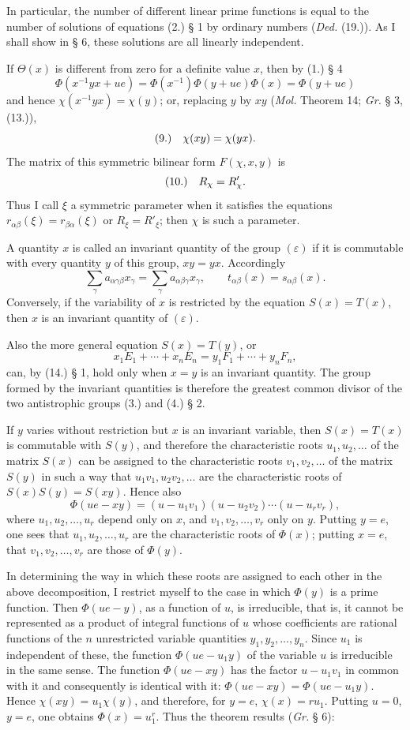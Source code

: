 \documentclass[11pt]{article}
\newcommand{\eps}{\varepsilon}
\newcommand{\fnum}[1]{\textup{(\ensuremath{#1}.)}\quad}
\begin{document}
In particular, the number of different linear prime functions is equal to the number of solutions of equations (2.) § 1 by ordinary numbers (\emph{Ded.} (19.)). As I shall show in § 6, these solutions are all linearly independent.

If $\Theta(x)$ is different from zero for a definite value $x$, then by (1.) § 4
\[
 \Phi(x^{-1}yx+ue)=\Phi(x^{-1})\Phi(y+ue)\Phi(x)=\Phi(y+ue)
\]
and hence $\chi(x^{-1}yx)=\chi(y)$; or, replacing $y$ by $xy$ (\emph{Mol.} Theorem 14; \emph{Gr.} § 3, (13.)),
\[
\fnum{9} \chi(xy)=\chi(yx).
\]
The matrix of this symmetric bilinear form $F(\chi,x,y)$ is
\[
\fnum{10} R_\chi=R'_\chi.
\]
Thus I call $\xi$ a symmetric parameter when it satisfies the equations $r_{\alpha\beta}(\xi)=r_{\beta\alpha}(\xi)$ or $R_\xi=R'_\xi$; then $\chi$ is such a parameter.

A quantity $x$ is called an invariant quantity of the group $(\eps)$ if it is commutable with every quantity $y$ of this group, $xy=yx$. Accordingly
\[
 \sum_\gamma a_{\alpha\gamma\beta}x_\gamma=\sum_\gamma a_{\alpha\beta\gamma}x_\gamma,\qquad
 t_{\alpha\beta}(x)=s_{\alpha\beta}(x).
\]
Conversely, if the variability of $x$ is restricted by the equation $S(x)=T(x)$, then $x$ is an invariant quantity of $(\eps)$.

Also the more general equation $S(x)=T(y)$, or
\[
 x_1E_1+\cdots+x_nE_n=y_1F_1+\cdots+y_nF_n,
\]
can, by (14.) § 1, hold only when $x=y$ is an invariant quantity. The group formed by the invariant quantities is therefore the greatest common divisor of the two antistrophic groups (3.) and (4.) § 2.

If $y$ varies without restriction but $x$ is an invariant variable, then $S(x)=T(x)$ is commutable with $S(y)$, and therefore the characteristic roots $u_1,u_2,\ldots$ of the matrix $S(x)$ can be assigned to the characteristic roots $v_1,v_2,\ldots$ of the matrix $S(y)$ in such a way that $u_1v_1,u_2v_2,\ldots$ are the characteristic roots of $S(x)S(y)=S(xy)$. Hence also
\[
 \Phi(ue-xy)=(u-u_1v_1)(u-u_2v_2)\cdots(u-u_rv_r),
\]
where $u_1,u_2,\ldots,u_r$ depend only on $x$, and $v_1,v_2,\ldots,v_r$ only on $y$. Putting $y=e$, one sees that $u_1,u_2,\ldots,u_r$ are the characteristic roots of $\Phi(x)$; putting $x=e$, that $v_1,v_2,\ldots,v_r$ are those of $\Phi(y)$.

In determining the way in which these roots are assigned to each other in the above decomposition, I restrict myself to the case in which $\Phi(y)$ is a prime function. Then $\Phi(ue-y)$, as a function of $u$, is irreducible, that is, it cannot be represented as a product of integral functions of $u$ whose coefficients are rational functions of the $n$ unrestricted variable quantities $y_1,y_2,\ldots,y_n$. Since $u_1$ is independent of these, the function $\Phi(ue-u_1y)$ of the variable $u$ is irreducible in the same sense. The function $\Phi(ue-xy)$ has the factor $u-u_1v_1$ in common with it and consequently is identical with it: $\Phi(ue-xy)=\Phi(ue-u_1y)$. Hence $\chi(xy)=u_1\chi(y)$, and therefore, for $y=e$, $\chi(x)=ru_1$. Putting $u=0$, $y=e$, one obtains $\Phi(x)=u_1^r$. Thus the theorem results (\emph{Gr.} § 6):
\end{document}
